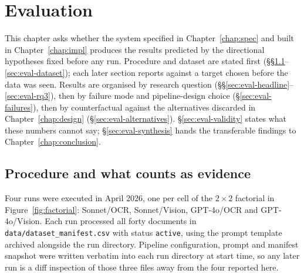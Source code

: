 
\chapter{Evaluation}
\label{chap:evaluation}

This chapter asks whether the system specified in
Chapter~\ref{chap:spec} and built in Chapter~\ref{chap:impl} produces
the results predicted by the directional hypotheses fixed before any
run. Procedure and dataset are stated first
(\S\S\ref{sec:eval-procedure}--\ref{sec:eval-dataset}); each later
section reports against a target chosen before the data was seen.
Results are organised by research question
(\S\S\ref{sec:eval-headline}--\ref{sec:eval-rq3}), then by failure
mode and pipeline-design choice (\S\ref{sec:eval-failures}), then by
counterfactual against the alternatives discarded in
Chapter~\ref{chap:design} (\S\ref{sec:eval-alternatives}).
\S\ref{sec:eval-validity} states what these numbers cannot say;
\S\ref{sec:eval-synthesis} hands the transferable findings to
Chapter~\ref{chap:conclusion}.

\section{Procedure and what counts as evidence}
\label{sec:eval-procedure}

Four runs were executed in April 2026, one per cell of the
$2\times 2$ factorial in Figure~\ref{fig:factorial}: Sonnet/OCR,
Sonnet/Vision, GPT-4o/OCR and GPT-4o/Vision. Each run processed all
forty documents in \texttt{data/dataset\_manifest.csv} with status
\texttt{active}, using the prompt template archived alongside the run
directory. Pipeline configuration, prompt and manifest snapshot were
written verbatim into each run directory at start time, so any later
run is a diff inspection of those three files away from the four
reported here.

